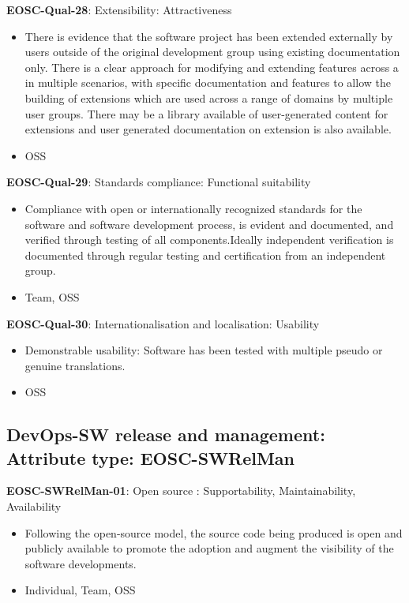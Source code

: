\textbf{EOSC-Qual-28}: Extensibility: Attractiveness

\begin{itemize}
    \item There is evidence that the software project has been extended externally by users outside of the original development group using existing documentation only. There is a clear approach for modifying and extending features across a in multiple scenarios, with specific documentation and features to allow the building of extensions which are used across a range of domains by multiple user groups. There may be a library available of user-generated content for extensions and user generated documentation on extension is also available. \cite{shepherdson_cessda_2019}
    \item OSS
\end{itemize}

\textbf{EOSC-Qual-29}: Standards compliance: Functional suitability

\begin{itemize}
    \item Compliance with open or internationally recognized standards for the software and software development process, is evident and documented, and verified through testing of all components.Ideally independent verification is documented through regular testing and certification from an independent group. \cite{shepherdson_cessda_2019}
    \item Team, OSS
\end{itemize}

\textbf{EOSC-Qual-30}: Internationalisation and localisation: Usability

\begin{itemize}
    \item Demonstrable usability: Software has been tested with multiple pseudo or genuine translations. \cite{shepherdson_cessda_2019}
    \item OSS
\end{itemize}

\subsection{DevOps-SW release and management: Attribute type: EOSC-SWRelMan}

\textbf{EOSC-SWRelMan-01}: Open source : Supportability, Maintainability, Availability

\begin{itemize}
    \item Following the open-source model, the source code being produced is open and publicly available to promote the adoption and augment the visibility of the software developments. \cite{orviz_set_2017,raymond_software_2013}
    \item Individual, Team, OSS
\end{itemize}

